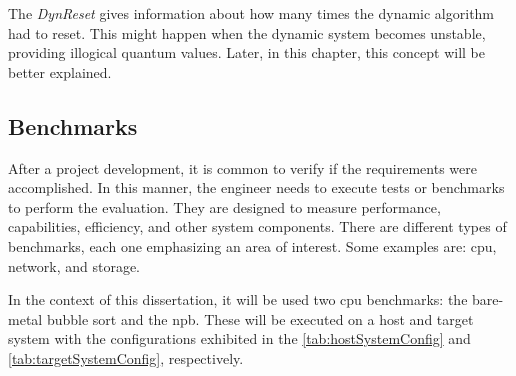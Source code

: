 The \textit{DynReset} \space gives information about how many times the dynamic algorithm had to reset. This might happen when the dynamic system 
becomes unstable, providing illogical quantum values. Later, in this chapter, this concept will be better explained. 


\subsection{Benchmarks}
\label{cap:BM}

After a project development, it is common to verify if the requirements were accomplished. In this manner, the engineer 
needs to execute tests or benchmarks to perform the evaluation. They are designed to measure performance, capabilities, efficiency, 
and other system components. There are different types of benchmarks, each one emphasizing an area of interest. 
Some examples are: \gls{cpu}, network, and storage. 

In the context of this dissertation, it will be used two \gls{cpu} benchmarks: the bare-metal bubble sort and the \gls{npb}. These will be
executed on a host and target system with the configurations exhibited in the \autoref{tab:hostSystemConfig} and \autoref{tab:targetSystemConfig}, 
respectively.
\newline

